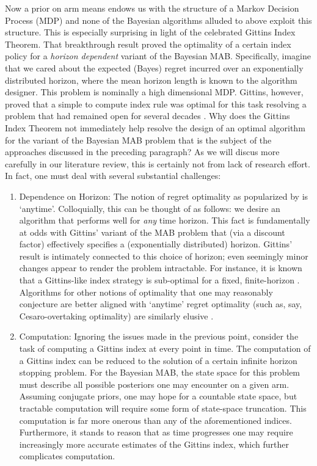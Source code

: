 Now a prior on arm means endows us with the structure of a Markov Decision Process (MDP) and none of the Bayesian algorithms alluded to above exploit this structure. This is especially surprising in light of the celebrated Gittins Index Theorem. That breakthrough result proved the optimality of a certain index policy for a {\em horizon dependent} variant of the Bayesian MAB. Specifically, imagine that we cared about the expected (Bayes) regret incurred over an exponentially distributed horizon, where the mean horizon length is known to the algorithm designer. This problem is nominally a high dimensional MDP. Gittins, however, proved that a simple to compute index rule was optimal for this task resolving a problem that had remained open for several decades \cite{}. Why does the Gittins Index Theorem not immediately help resolve the design of an optimal algorithm for the variant of the Bayesian MAB problem that is the subject of the approaches discussed in the preceding paragraph? As we will discus more carefully in our literature review, this is certainly not from lack of research effort. In fact, one must deal with several substantial challenges:
\begin{enumerate}
\item
Dependence on Horizon: The notion of regret optimality as popularized by \cite{lai1985asymptotically} is `anytime'. Colloquially, this can be thought of as follows: we desire an algorithm that performs well for {\em any} time horizon. This fact is fundamentally at odds with Gittins' variant of the MAB problem that (via a discount factor) effectively specifies a (exponentially distributed) horizon. Gittins' result is intimately connected to this choice of horizon; even seemingly minor changes appear to render the problem intractable. For instance, it is known that a Gittins-like index strategy is sub-optimal for a fixed, finite-horizon \citep{berry1985bandit}. Algorithms for other notions of optimality that one may reasonably conjecture are better aligned with `anytime' regret optimality (such as, say, Cesaro-overtaking optimality) are similarly elusive \cite{katehakis}.  
\item
Computation: Ignoring the issues made in the previous point, consider the task of computing a Gittins index at every point in time. 
The computation of a Gittins index can be reduced to the solution of a certain infinite horizon stopping problem. For the Bayesian MAB, the state space for this problem must describe all possible posteriors one may encounter on a given arm. Assuming conjugate priors, one may hope for a countable state space, but tractable computation will require some form of state-space truncation. This computation is far more onerous than any of the aforementioned indices. Furthermore, it stands to reason that as time progresses one may require increasingly more accurate estimates of the Gittins index, which further complicates computation.  
\end{enumerate}

